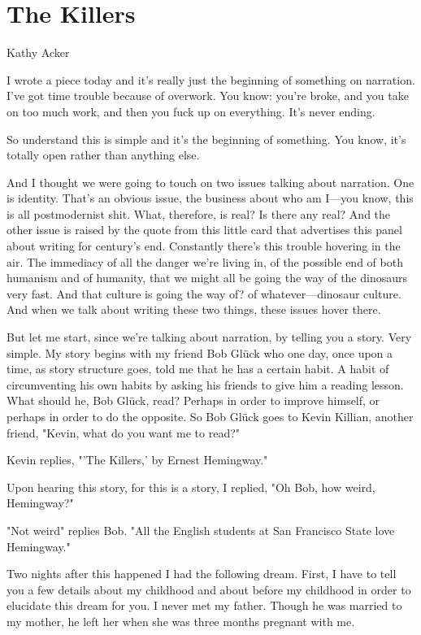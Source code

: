 \frontmatter

\mainmatter

\hypertarget{the-killers}{%
\section{The Killers}\label{the-killers}}

Kathy Acker

I wrote a piece today and it's really just the beginning of something on
narration. I've got time trouble because of overwork. You know: you're
broke, and you take on too much work, and then you fuck up on
everything. It's never ending.

So understand this is simple and it's the beginning of something. You
know, it's totally open rather than anything else.

And I thought we were going to touch on two issues talking about
narration. One is identity. That's an obvious issue, the business about
who am I---you know, this is all postmodernist shit. What, therefore, is
real? Is there any real? And the other issue is raised by the quote from
this little card that advertises this panel about writing for century's
end. Constantly there's this trouble hovering in the air. The immediacy
of all the danger we're living in, of the possible end of both humanism
and of humanity, that we might all be going the way of the dinosaurs
very fast. And that culture is going the way of? of whatever---dinosaur
culture. And when we talk about writing these two things, these issues
hover there.

But let me start, since we're talking about narration, by telling you a
story. Very simple. My story begins with my friend Bob Glück who one
day, once upon a time, as story structure goes, told me that he has a
certain habit. A habit of circumventing his own habits by asking his
friends to give him a reading lesson. What should he, Bob Glück, read?
Perhaps in order to improve himself, or perhaps in order to do the
opposite. So Bob Glück goes to Kevin Killian, another friend, "Kevin,
what do you want me to read?"

Kevin replies, "'The Killers,' by Ernest Hemingway."

Upon hearing this story, for this is a story, I replied, "Oh Bob, how
weird, Hemingway?"

"Not weird" replies Bob. "All the English students at San Francisco
State love Hemingway."

Two nights after this happened I had the following dream. First, I have
to tell you a few details about my childhood and about before my
childhood in order to elucidate this dream for you. I never met my
father. Though he was married to my mother, he left her when she was
three months pregnant with me.

